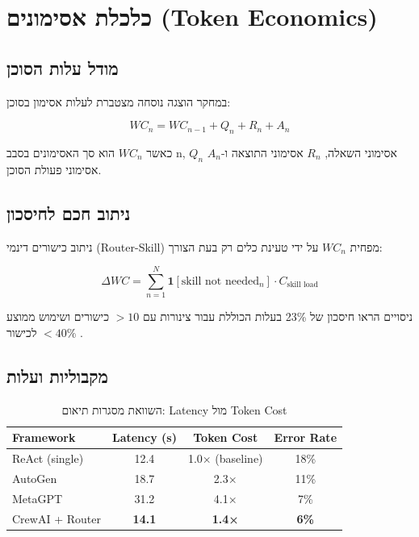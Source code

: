 
\clearpage
\chapter{כלכלת אסימונים (\textenglish{Token Economics})}

\section{מודל עלות הסוכן}

במחקר \cite{segal2024orchestration} הוצגה נוסחה מצטברת לעלות אסימון בסוכן:

\begin{equation}
WC_n = WC_{n-1} + Q_n + R_n + A_n
\end{equation}

כאשר \(WC_n\) הוא סך האסימונים בסבב \textenglish{n}, \(Q_n\) אסימוני השאלה, \(R_n\) אסימוני התוצאה ו-\(A_n\) אסימוני פעולת הסוכן.

\section{ניתוב חכם לחיסכון}

ניתוב כישורים דינמי (\textenglish{Router-Skill}) מפחית \(WC_n\) על ידי טעינת כלים רק בעת הצורך:

\begin{equation}
\Delta WC = \sum_{n=1}^{N} \mathbf{1}[\text{skill not needed}_n] \cdot C_{\text{skill load}}
\end{equation}

ניסויים הראו חיסכון של \textenglish{23\%} בעלות הכוללת עבור צינורות עם \textenglish{$> 10$} כישורים ושימוש ממוצע \textenglish{$< 40\%$} לכישור \cite{segal2024orchestration}.

\section{מקבוליות ועלות}

\begin{table}[H]
\centering
\caption{השוואת מסגרות תיאום: \textenglish{Latency} מול \textenglish{Token Cost}}
\label{tab:frameworks}
\begin{english}
\begin{tabular}{lccc}
\toprule
\textbf{Framework} & \textbf{Latency (s)} & \textbf{Token Cost} & \textbf{Error Rate} \\
\midrule
ReAct (single)   & 12.4 & 1.0× (baseline) & 18\% \\
AutoGen          & 18.7 & 2.3×             & 11\% \\
MetaGPT          & 31.2 & 4.1×             & 7\%  \\
CrewAI + Router  & \textbf{14.1} & \textbf{1.4×} & \textbf{6\%} \\
\bottomrule
\end{tabular}
\end{english}
\end{table}
